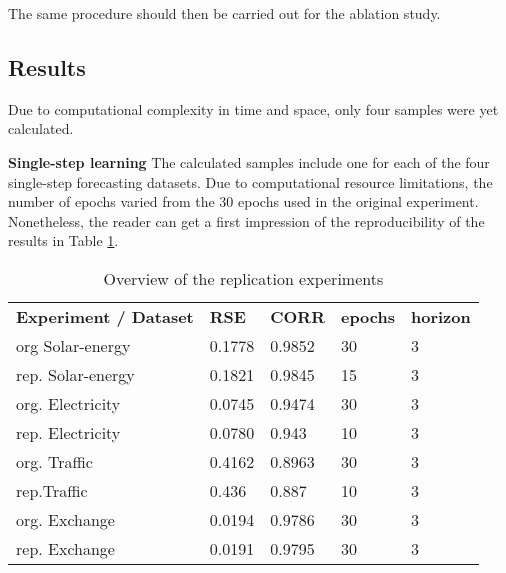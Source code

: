 \documentclass[letterpaper, twocolumn,11pt]{article}
\begin{document}
    The same procedure should then be carried out for the ablation study.

    \subsection{Results}
    Due to computational complexity in time and space, only four samples were yet calculated.


    \textbf{Single-step learning} The calculated samples include one for each of the four single-step forecasting datasets.
    Due to computational resource limitations, the number of epochs varied from the 30 epochs used in the original experiment.
    Nonetheless, the reader can get a first impression of the reproducibility of the results in Table \ref{tab:table}.

   \begin{table}
       \centering
       \caption{Overview of the replication experiments}
       \scriptsize
       \begin{tabular}{lllll}
           \hline
           \textbf{Experiment / Dataset} & \textbf{RSE} & \textbf{CORR} & \textbf{epochs} & \textbf{horizon} \\
           \hhline{=====}
           org Solar-energy~             & 0.1778       & 0.9852        & 30              & 3                \\
           rep. Solar-energy             & 0.1821       & 0.9845        & 15              & 3                \\
           \hhline{-----}
           org. Electricity              & 0.0745       & 0.9474        & 30              & 3                \\
           rep. Electricity              & 0.0780       & 0.943         & 10               & 3                \\
           \hhline{-----}
           org. Traffic                  & 0.4162       & 0.8963        & 30              & 3                \\
           rep.Traffic                   &   0.436        &  0.887       & 10               & 3                \\
           \hhline{-----}
           org. Exchange                 & 0.0194       & 0.9786        & 30              & 3                \\
           rep. Exchange                 & 0.0191       & 0.9795        & 30              & 3                \\
           \hline
       \end{tabular}\label{tab:table}
   \end{table}
\end{document}
